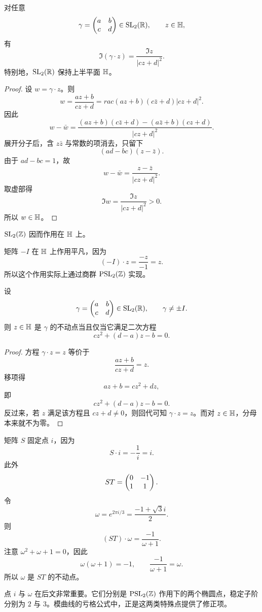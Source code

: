 \begin{lemma}
对任意
\[
\gamma=\begin{pmatrix} a&b\\ c&d \end{pmatrix}\in \mathrm{SL}_2(\mathbb{R}),\qquad z\in \mathbb{H},
\]
有
\[
\Im(\gamma\cdot z)=\frac{\Im z}{|cz+d|^2}.
\]
特别地，$\mathrm{SL}_2(\mathbb{R})$ 保持上半平面 $\mathbb{H}$。
\end{lemma}

\begin{proof}
设 $w=\gamma\cdot z$。则
\[
w=\frac{az+b}{cz+d}=rac{(az+b)(c\bar z+d)}{|cz+d|^2}.
\]
因此
\[
w-\bar w
=\frac{(az+b)(c\bar z+d)-(a\bar z+b)(cz+d)}{|cz+d|^2}.
\]
展开分子后，含 $z\bar z$ 与常数的项消去，只留下
\[
(ad-bc)(z-\bar z).
\]
由于 $ad-bc=1$，故
\[
w-\bar w=\frac{z-\bar z}{|cz+d|^2}.
\]
取虚部得
\[
\Im w=\frac{\Im z}{|cz+d|^2}>0.
\]
所以 $w\in\mathbb{H}$。
\end{proof}

\begin{corollary}
$\mathrm{SL}_2(\mathbb{Z})$ 因而作用在 $\mathbb{H}$ 上。
\end{corollary}

\begin{remark}
矩阵 $-I$ 在 $\mathbb{H}$ 上作用平凡，因为
\[
(-I)\cdot z=\frac{-z}{-1}=z.
\]
所以这个作用实际上通过商群 $\mathrm{PSL}_2(\mathbb{Z})$ 实现。
\end{remark}

\begin{proposition}
设
\[
\gamma=\begin{pmatrix} a&b\\ c&d \end{pmatrix}\in \mathrm{SL}_2(\mathbb{R}),\qquad \gamma\ne \pm I.
\]
则 $z\in\mathbb{H}$ 是 $\gamma$ 的不动点当且仅当它满足二次方程
\[
cz^2+(d-a)z-b=0.
\]
\end{proposition}

\begin{proof}
方程 $\gamma\cdot z=z$ 等价于
\[
\frac{az+b}{cz+d}=z.
\]
移项得
\[
az+b=cz^2+dz,
\]
即
\[
cz^2+(d-a)z-b=0.
\]
反过来，若 $z$ 满足该方程且 $cz+d\ne 0$，则回代可知 $\gamma\cdot z=z$。而对 $z\in\mathbb{H}$，分母本来就不为零。
\end{proof}

\begin{example}
矩阵 $S$ 固定点 $i$，因为
\[
S\cdot i=-\frac{1}{i}=i.
\]
此外
\[
ST=\begin{pmatrix} 0&-1\\ 1&1 \end{pmatrix}.
\]
令
\[
\omega=e^{2\pi i/3}=\frac{-1+\sqrt{3}i}{2}.
\]
则
\[
(ST)\cdot \omega=\frac{-1}{\omega+1}.
\]
注意 $\omega^2+\omega+1=0$，因此
\[
\omega(\omega+1)=-1,
\qquad
\frac{-1}{\omega+1}=\omega.
\]
所以 $\omega$ 是 $ST$ 的不动点。
\end{example}

\begin{remark}
点 $i$ 与 $\omega$ 在后文非常重要。它们分别是 $\mathrm{PSL}_2(\mathbb{Z})$ 作用下的两个椭圆点，稳定子阶分别为 $2$ 与 $3$。模曲线的亏格公式中，正是这两类特殊点提供了修正项。
\end{remark}

